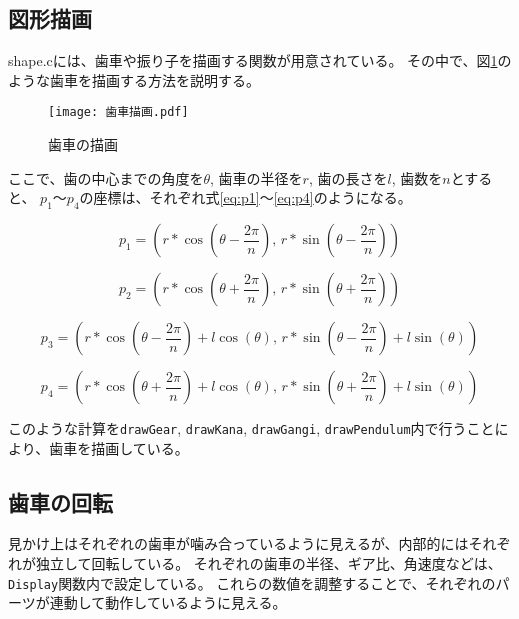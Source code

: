 \documentclass[a4j,titlepage]{jsarticle}
\begin{document}
\subsection{図形描画}
shape.cには、歯車や振り子を描画する関数が用意されている。
その中で、図\ref{fig:gear}のような歯車を描画する方法を説明する。

\begin{figure}[H]
  \centering
  \texttt{[image: 歯車描画.pdf]}
  \caption{歯車の描画}
  \label{fig:gear}
\end{figure}

ここで、歯の中心までの角度を$\theta$, 歯車の半径を$r$, 歯の長さを$l$, 歯数を$n$とすると、
$p_1$～$p_4$の座標は、それぞれ式\ref{eq:p1}～\ref{eq:p4}のようになる。

\begin{equation}
  p_1 = \left( r * \cos \left( \theta - \frac{2 \pi}{n} \right), \, r * \sin \left( \theta - \frac{2 \pi}{n} \right) \right)
  \label{eq:p1}
\end{equation}

\begin{equation}
  p_2 = \left( r * \cos \left( \theta + \frac{2 \pi}{n} \right), \, r * \sin \left( \theta + \frac{2 \pi}{n} \right) \right)
  \label{eq:p2}
\end{equation}

\begin{equation}
  p_3 = \left( r * \cos \left( \theta - \frac{2 \pi}{n} \right) + l \cos(\theta), \, r * \sin \left( \theta - \frac{2 \pi}{n} \right) + l \sin(\theta) \right)
  \label{eq:p3}
\end{equation}

\begin{equation}
  p_4 = \left( r * \cos \left( \theta + \frac{2 \pi}{n} \right) + l \cos(\theta), \, r * \sin \left( \theta + \frac{2 \pi}{n} \right) + l \sin(\theta) \right)
  \label{eq:p4}
\end{equation}

このような計算を\texttt{drawGear}, \texttt{drawKana}, \texttt{drawGangi}, \texttt{drawPendulum}内で行うことにより、歯車を描画している。

\subsection{歯車の回転}
見かけ上はそれぞれの歯車が噛み合っているように見えるが、内部的にはそれぞれが独立して回転している。
それぞれの歯車の半径、ギア比、角速度などは、\texttt{Display}関数内で設定している。
これらの数値を調整することで、それぞれのパーツが連動して動作しているように見える。
\end{document}
